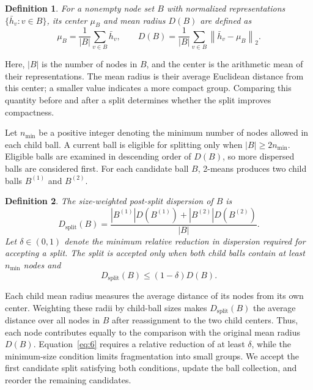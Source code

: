 \documentclass[10pt,letterpaper,nopreprintline]{elsarticle}
\theoremstyle{plain}
\newtheorem{definition}{Definition}
\begin{document}
\Needspace{64pt}
\begin{definition}
For a nonempty node set \(B\) with normalized representations \(\{\bar h_v:v\in B\}\), its center \(\mu_B\) and mean radius \(D(B)\) are defined as
\begin{equation}\label{eq:4}
\mu_{B} = \frac{1}{|B|}\sum_{v \in B}{\bar{h}}_{v},\quad\quad D(B) = \frac{1}{|B|}\sum_{v \in B}\left\| {\bar{h}}_{v} - \mu_{B} \right\|_{2}.
\end{equation}
\end{definition}

Here, \(|B|\) is the number of nodes in \(B\), and the center is the arithmetic mean of their representations. The mean radius is their average Euclidean distance from this center; a smaller value indicates a more compact group. Comparing this quantity before and after a split determines whether the split improves compactness.

\Needspace{64pt}

Let \(n_{\min}\) be a positive integer denoting the minimum number of nodes allowed in each child ball. A current ball is eligible for splitting only when \(|B|\geq 2n_{\min}\). Eligible balls are examined in descending order of \(D(B)\), so more dispersed balls are considered first. For each candidate ball \(B\), 2-means produces two child balls \(B^{(1)}\) and \(B^{(2)}\).

\begin{definition}
The size-weighted post-split dispersion of \(B\) is
\begin{equation}\label{eq:5}
D_{\mathrm{split}}(B) = \frac{|B^{(1)}|D(B^{(1)}) + |B^{(2)}|D(B^{(2)})}{|B|}.
\end{equation}
Let \(\delta \in (0,1)\) denote the minimum relative reduction in dispersion required for accepting a split. The split is accepted only when both child balls contain at least \(n_{\min}\) nodes and
\begin{equation}\label{eq:6}
D_{\mathrm{split}}(B) \leq (1 - \delta)D(B).
\end{equation}
\end{definition}

Each child mean radius measures the average distance of its nodes from its own center. Weighting these radii by child-ball sizes makes \(D_{\mathrm{split}}(B)\) the average distance over all nodes in \(B\) after reassignment to the two child centers. Thus, each node contributes equally to the comparison with the original mean radius \(D(B)\). Equation~\eqref{eq:6} requires a relative reduction of at least \(\delta\), while the minimum-size condition limits fragmentation into small groups. We accept the first candidate split satisfying both conditions, update the ball collection, and reorder the remaining candidates.
\end{document}
